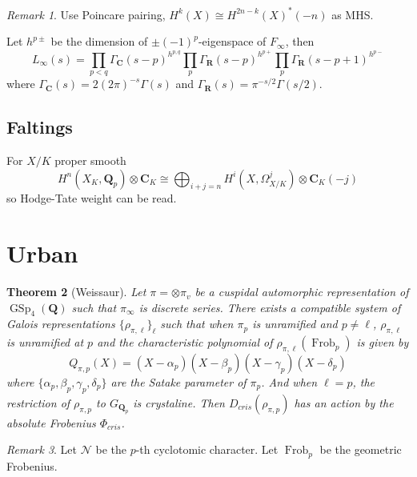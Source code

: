 \documentclass[leqno]{amsart}
\DeclareMathOperator{\GSp}{GSp}
\DeclareMathOperator{\Frob}{Frob}
\newcommand{\Q}{{\mathbf{Q}}}
\newcommand{\Qp}{\mathbf{Q}_p}
\newcommand{\R}{\mathbf R}
\newcommand{\C}{\mathbf C}
\newcommand{\1}{\mathbf{1}}
\newtheorem{thm}{Theorem}[section]
\theoremstyle{definition}
\theoremstyle{remark}
\newtheorem{rem}[thm]{Remark}
\begin{document}
\begin{rem}
	Use Poincare pairing,
	$H^k(X)\cong H^{2n-k}(X)^*(-n)$ 
	as MHS.
\end{rem}

Let $h^{p\pm}$ 
be the dimension of $\pm(-1)^p$-eigenspace of  $F_\infty$,
then
 \[
	 L_\infty(s)=
	 \prod_{p<q}\Gamma_\C(s-p)^{h^{p,q}}
	 \prod_{p}\Gamma_\R(s-p)^{h^{p+}}
	 \prod_{p}\Gamma_\R(s-p+1)^{h^{p-}}
\]
where $\Gamma_\C(s)=2(2\pi)^{-s}\Gamma(s)$
and $\Gamma_\R(s)=\pi^{-s/2}\Gamma(s/2)$.

\subsection{Faltings}
For $X/K$ proper smooth
 \[
	 H^n(X_{K},\Qp)\otimes \C_K\cong
	 \bigoplus_{i+j=n}
	 H^i(X,\Omega^j_{X/K})\otimes \C_K(-j)
\]
so Hodge-Tate weight can be read.

\section{Urban}

\begin{thm}[Weissaur]
	Let $\pi=\otimes\pi_v$
	be a cuspidal automorphic representation
	of  $\GSp_4(\Q)$ such that
	 $\pi_\infty$ is discrete series.
	 There exists a compatible system
	 of Galois representations  $\{\rho_{\pi,\ell}\}_\ell$
	 such that when $\pi_p$ is unramified and  $p\neq \ell$,
	  $\rho_{\pi,\ell}$ is unramified at $p$
	  and the characteristic polynomial of  
	  $\rho_{\pi,\ell}(\Frob_p)$ is given by 
	  \[
		  Q_{\pi,p}(X)=
		  (X-\alpha_p)
		  (X-\beta_p)
		  (X-\gamma_p)
		  (X-\delta_p)
	  \]
	  where $\{\alpha_p,\beta_p,\gamma_p,\delta_p\}$ 
	  are the Satake parameter of $\pi_p$.
	  And when $\ell=p$, 
	  the restriction of $\rho_{\pi,p}$
	  to $G_{\Q_p}$ is crystaline.
	  Then $D_{cris}(\rho_{\pi,p})$
	  has an action by the 
	  absolute Frobenius $\Phi_{cris}$.
\end{thm}

\begin{rem}
	Let $\mathcal{N}$
	be the  $p$-th cyclotomic character.
	Let $\Frob_p$ be the geometric Frobenius.
\end{rem}
\end{document}
